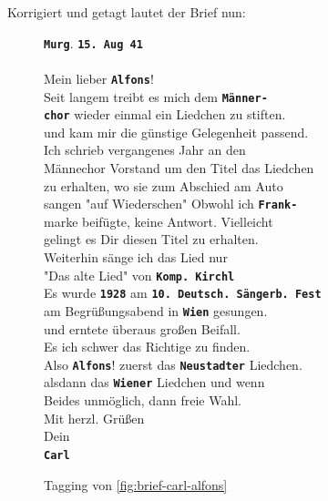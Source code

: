 \documentclass[12pt, a4paper, ngerman, bidi=default]{article}
\begin{document}
Korrigiert und getagt lautet der Brief nun:
  \begin{figure}[htbp]
  \centering
\begin{tcolorbox}[colback=oldLetter, colframe=black, sharp corners, width=\textwidth]
  \textbf{\colorbox{place}{\texttt{Murg}}}.  \textbf{\colorbox{date}{\texttt{15. Aug 41}}} \\
\\
Mein lieber  \textbf{\colorbox{person}{\texttt{Alfons}}}!\\
Seit langem treibt es mich dem  \textbf{\colorbox{organization}{\texttt{Männer-}}}\\
\textbf{\colorbox{organization}{\texttt{chor}}} wieder einmal ein Liedchen zu stiften.\\
und kam mir die günstige Gelegenheit passend.\\
Ich schrieb vergangenes Jahr an den\\
Männechor Vorstand um den Titel das Liedchen\\
zu erhalten, wo sie zum Abschied am Auto \\
sangen "auf Wiederschen" Obwohl ich  \textbf{\colorbox{unclear}{\texttt{Frank-}}}\\
marke beifügte, keine Antwort. Vielleicht\\
gelingt es Dir diesen Titel zu erhalten.\\
Weiterhin sänge ich das Lied nur\\
"Das alte Lied" von  \textbf{\colorbox{abbrev}{\texttt{Komp.}}}\textbf{\colorbox{person}{\texttt{ Kirchl}}}\\
Es wurde \textbf{\colorbox{date}{\texttt{1928}}} am \textbf{\colorbox{eventTag}{\texttt{10. Deutsch. Sängerb. Fest}}}\\
am Begrüßungsabend in \textbf{\colorbox{place}{\texttt{Wien}}} gesungen.\\
und erntete überaus großen Beifall.\\
Es ich schwer das Richtige zu finden.\\
Also \textbf{\colorbox{person}{\texttt{Alfons}}}! zuerst das \textbf{\colorbox{place}{\texttt{Neustadter}}} Liedchen.\\
alsdann das \textbf{\colorbox{place}{\texttt{Wiener}}} Liedchen und wenn\\
Beides unmöglich, dann freie Wahl.\\
Mit herzl. Grüßen \\
Dein\\
\textbf{\colorbox{person}{\texttt{Carl}}}\\
\end{tcolorbox}
\caption{Tagging von \autoref{fig:brief-carl-alfons}}
  \label{fig:Tagging-brief-carl-alfons}
\end{figure}
\end{document}
